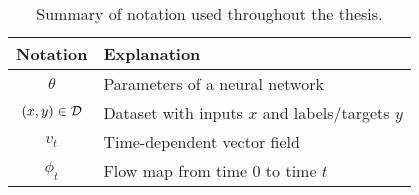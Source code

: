 \begin{table}[t!]
    \centering
    \begin{tabular}{cl}
        \toprule
        \textbf{Notation} & \textbf{Explanation} \\
        \midrule

        $\theta$             & Parameters of a neural network \\
        $(x,y) \in \mathcal{D}$    & Dataset with inputs $x$ and labels/targets $y$ \\
        $v_t$                & Time-dependent vector field  \\
        $\phi_t$             & Flow map from time 0 to time $t$ \\
        
        

        \bottomrule
    \end{tabular}
    \caption{\label{tab:notation} Summary of notation used throughout the thesis.}
\end{table}
\clearpage